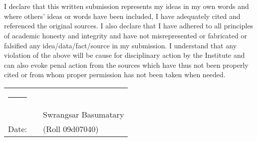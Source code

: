 \chapter*{}

I declare that this written submission represents my ideas in my own words
and where others' ideas or words have been included, I have adequately cited
and referenced the original sources. I also declare that I have adhered to all
principles of academic honesty and integrity and have not misrepresented or
fabricated or falsified any idea/data/fact/source in my submission. I
understand that any violation of the above will be cause for disciplinary
action by the Institute and can also evoke penal action from the sources which
have thus not been properly cited or from whom proper permission has not been
taken when needed.

\vspace{1.5cm}

\begin{tabular}{lll}
\rule{40mm}{0pt}        & \rule{60mm}{0pt}       & \dotfill \\
                        &                        & Swrangsar Basumatary \\
Date:\dotfill           &                        & (Roll 09d07040)\\
\end{tabular}
